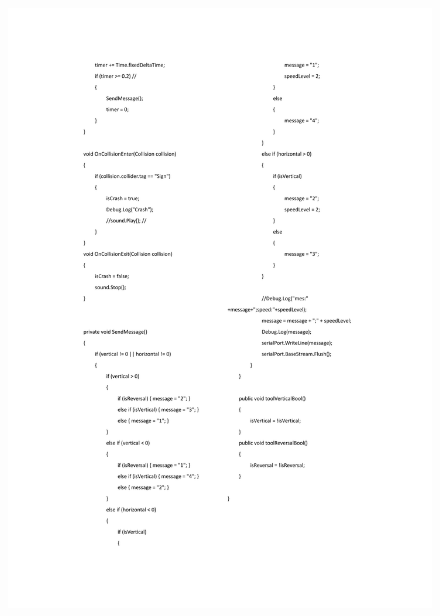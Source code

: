 \begin{figure}[h]
\centering
\includegraphics[width=1\textwidth,height=0.7\textheight]{A_thesis/appendix/code_unity-2.png}
\end{figure}
\newpage

